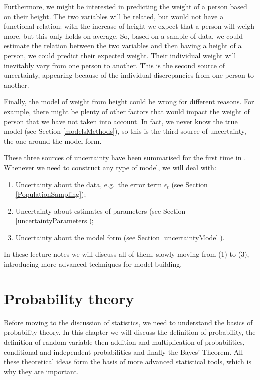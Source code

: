 \documentclass[
]{book}
\providecommand{\tightlist}{%
  \setlength{\itemsep}{0pt}\setlength{\parskip}{0pt}}
\theoremstyle{definition}
\theoremstyle{definition}
\theoremstyle{definition}
\theoremstyle{definition}
\theoremstyle{remark}
\begin{document}
Furthermore, we might be interested in predicting the weight of a person based on their height. The two variables will be related, but would not have a functional relation: with the increase of height we expect that a person will weigh more, but this only holds on average. So, based on a sample of data, we could estimate the relation between the two variables and then having a height of a person, we could predict their expected weight. Their individual weight will inevitably vary from one person to another. This is the second source of uncertainty, appearing because of the individual discrepancies from one person to another.

Finally, the model of weight from height could be wrong for different reasons. For example, there might be plenty of other factors that would impact the weight of person that we have not taken into account. In fact, we never know the true model (see Section \ref{modelsMethods}), so this is the third source of uncertainty, the one around the model form.

These three sources of uncertainty have been summarised for the first time in \citet{Chatfield1996}. Whenever we need to construct any type of model, we will deal with:

\begin{enumerate}
\def\labelenumi{\arabic{enumi}.}
\tightlist
\item
  Uncertainty about the data, e.g.~the error term \(\epsilon_t\) (see Section \ref{PopulationSampling});
\item
  Uncertainty about estimates of parameters (see Section \ref{uncertaintyParameters});
\item
  Uncertainty about the model form (see Section \ref{uncertaintyModel}).
\end{enumerate}

In these lecture notes we will discuss all of them, slowly moving from (1) to (3), introducing more advanced techniques for model building.

\chapter{Probability theory}\label{probabilityTheory}

Before moving to the discussion of statistics, we need to understand the basics of probability theory. In this chapter we will discuss the definition of probability, the definition of random variable then addition and multiplication of probabilities, conditional and independent probabilities and finally the Bayes' Theorem. All these theoretical ideas form the basis of more advanced statistical tools, which is why they are important.
\end{document}
